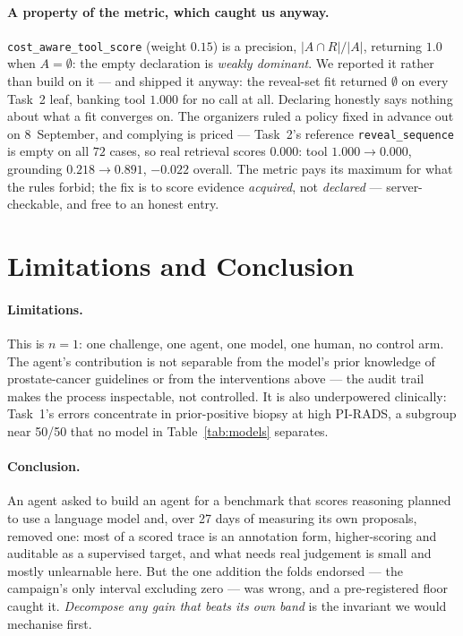 \documentclass[runningheads]{llncs}
\newcommand{\code}[1]{\texttt{\small #1}}
\begin{document}
\paragraph{A property of the metric, which caught us anyway.}
\code{cost\_aware\_tool\_score} (weight $0.15$) is a precision, $|A \cap R|/|A|$,
returning $1.0$ when $A = \emptyset$: the empty declaration is \emph{weakly dominant}.
We reported it rather than build on it --- and shipped it anyway: the reveal-set fit
returned $\emptyset$ on every Task~2 leaf, banking tool $1.000$ for no call at all.
Declaring honestly says nothing about what a fit converges on. The organizers ruled a
policy fixed in advance out on 8~September, and complying is priced --- Task~2's
reference \code{reveal\_sequence} is empty on all $72$ cases, so real retrieval scores
$0.000$: tool $1.000 \to 0.000$, grounding $0.218 \to 0.891$, $-0.022$ overall. The
metric pays its maximum for what the rules forbid; the fix is to score evidence
\emph{acquired}, not \emph{declared} --- server-checkable, and free to an honest entry.

\section{Limitations and Conclusion}

\paragraph{Limitations.} This is $n=1$: one challenge, one agent, one model, one human,
no control arm. The agent's contribution is not separable from the model's prior
knowledge of prostate-cancer guidelines or from the interventions above --- the audit
trail makes the process inspectable, not controlled. It is also underpowered
clinically: Task~1's errors concentrate in prior-positive biopsy at high PI-RADS, a
subgroup near 50/50 that no model in Table~\ref{tab:models} separates.

\paragraph{Conclusion.} An agent asked to build an agent for a benchmark that scores
reasoning planned to use a language model and, over 27 days of measuring its own
proposals, removed one: most of a scored trace is an annotation form, higher-scoring
and auditable as a supervised target, and what needs real judgement is small and
mostly unlearnable here. But the one addition the folds endorsed --- the campaign's
only interval excluding zero --- was wrong, and a pre-registered floor caught it.
\emph{Decompose any gain that beats its own band} is the invariant we would mechanise
first.
\end{document}
